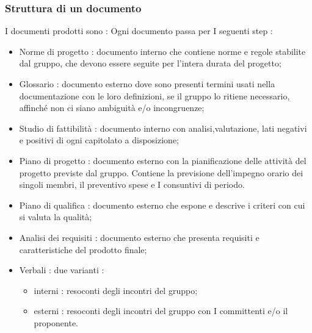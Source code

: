 \subsubsection{Struttura di un documento}
I documenti prodotti sono :
Ogni documento passa per I seguenti step :
\begin{itemize}
  \item Norme di progetto : documento interno che contiene norme e regole stabilite dal gruppo, che devono essere seguite per l’intera durata del progetto;
  \item Glossario : documento esterno dove sono presenti termini usati nella documentazione con le loro definizioni, se il gruppo lo ritiene necessario, affinché non ci siano ambiguità e/o incongruenze;
  \item Studio di fattibilità : documento interno con analisi,valutazione, lati negativi e positivi di ogni capitolato a disposizione;
  \item Piano di progetto : documento esterno con la pianificazione delle attività del progetto previste dal gruppo. Contiene la previsione dell’impegno orario dei singoli membri, il preventivo spese e I consuntivi di periodo.
  \item Piano di qualifica : documento esterno che espone e descrive i criteri con cui si valuta la qualità;
  \item Analisi dei requisiti : documento esterno che presenta requisiti e caratteristiche del prodotto finale;
  \item Verbali  : due varianti :
  \begin{itemize}
  		\item interni  : resoconti degli incontri del gruppo;
  		\item esterni  : resoconti degli incontri del gruppo con I committenti e/o il proponente.
	\end{itemize}

\end{itemize}
